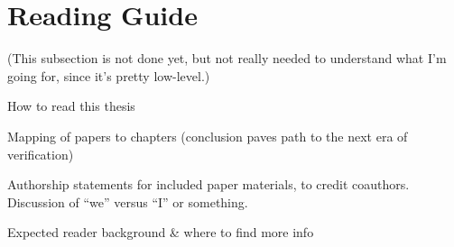 \section{Reading Guide}


(This subsection is not done yet, but not really needed to understand what I'm going for, since it's pretty low-level.)

How to read this thesis

Mapping of papers to chapters (conclusion paves path to the next era of verification)

Authorship statements for included paper materials, to credit coauthors. Discussion of ``we'' versus ``I'' or something.

Expected reader background \& where to find more info
